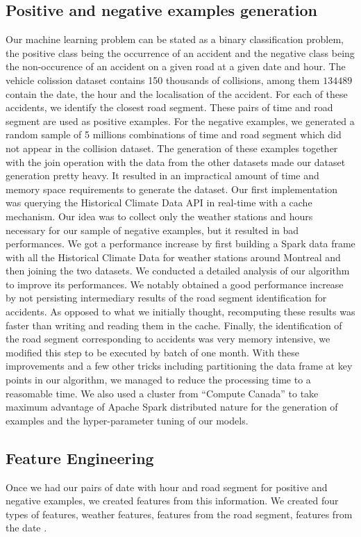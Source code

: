 \documentclass[conference]{IEEEtran}
\begin{document}
\subsection{Positive and negative examples generation}
Our machine learning problem can be stated as a binary classification problem, the positive class being the occurrence of an accident and the negative class being the non-occurence of an accident on a given road at a given date and hour. The vehicle colission dataset contains 150 thousands of collisions, among them $134 489$ contain the date, the hour and the localisation of the accident. For each of these accidents, we identify the closest road segment. These pairs of time and  road segment are used as positive examples. For the negative examples, we generated a random sample of 5 millions combinations of time and road segment which did not appear in the collision dataset.  The generation of these examples together with the join operation with the data from the other datasets made our dataset generation pretty heavy. It resulted in an impractical amount of time and memory space requirements to generate the dataset. Our first implementation was querying the Historical Climate Data API in real-time with a cache mechanism. Our idea was to collect only the weather stations and hours necessary for our sample of negative examples, but it resulted in bad performances. We got a performance increase by first building a Spark data frame with all the Historical Climate Data for weather stations around Montreal and then joining the two datasets. We conducted a detailed analysis of our algorithm to improve its performances. We notably obtained a good performance increase by not persisting intermediary results of the road segment identification for accidents. As opposed to what we initially thought, recomputing these results was faster than writing and reading them in the cache. Finally, the identification of the road segment corresponding to accidents was very memory intensive, we modified this step to be executed by batch of one month.  With these improvements and a few other tricks including partitioning the data frame at key points in our algorithm, we managed to reduce the processing time to a reasomable time. We also used a cluster from “Compute Canada” to take maximum advantage of Apache Spark distributed nature for the generation of examples and the hyper-parameter tuning of our models.

\subsection{Feature Engineering}
Once we had our pairs of date with hour and road segment for positive and negative examples, we created features from this information. We created four types of features, weather features, features from the road segment, features from the date .
\end{document}

